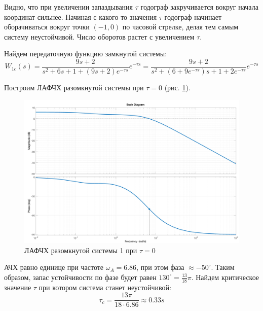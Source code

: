 Видно, что при увеличении запаздывания $\tau$ годограф закручивается вокруг начала координат сильнее. 
Начиная с какого-то значения $\tau$ годограф начинает оборачиваться вокруг точки $(-1, 0)$ по часовой стрелке,
делая тем самым систему неустойчивой.
Число оборотов растет с увеличением $\tau$. 

Найдем передаточную функцию замкнутой системы: 
\begin{equation}
    W_{1c}(s) = \frac{9s + 2}{s^2 + 6s + 1 + (9s + 2)e^{-\tau s}}e^{-\tau s} = \frac{9s + 2}{s^2 + (6 + 9e^{-\tau s})s + 1 + 2e^{-\tau s}} e^{-\tau s}
\end{equation}

Построим ЛАФЧХ разомкнутой системы при $\tau = 0$ (рис. \ref{fig:task6_bode_open_1}).
\begin{figure}[ht!]
    \centering
    \includegraphics[width=\textwidth]{media/plots/task6_bode_open_1.png}
    \caption{ЛАФЧХ разомкнутой системы 1 при $\tau = 0$}
    \label{fig:task6_bode_open_1}
\end{figure}
АЧХ равно единице при частоте $\omega_A = 6.86$, при этом фаза $\approx-50^\circ$. 
Таким образом, запас устойчивости по фазе будет равен $130^\circ = \frac{13}{18}\pi$. 
Найдем критическое значение $\tau$ при котором система станет неустойчивой: 
\begin{equation}
    \tau_c = \frac{13\pi}{18 \cdot 6.86} \approx 0.33s 
\end{equation}

